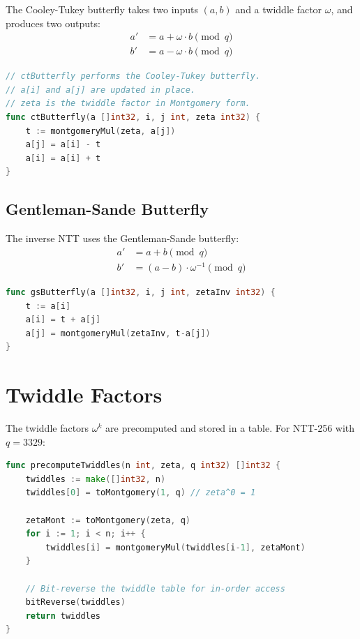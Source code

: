\documentclass[11pt,a4paper]{article}
\begin{document}
The Cooley-Tukey butterfly takes two inputs $(a, b)$ and a twiddle factor $\omega$, and
produces two outputs:
\begin{align}
a' &= a + \omega \cdot b \pmod{q} \\
b' &= a - \omega \cdot b \pmod{q}
\end{align}

\begin{lstlisting}[language=Go,caption={Cooley-Tukey butterfly in Go}]
// ctButterfly performs the Cooley-Tukey butterfly.
// a[i] and a[j] are updated in place.
// zeta is the twiddle factor in Montgomery form.
func ctButterfly(a []int32, i, j int, zeta int32) {
    t := montgomeryMul(zeta, a[j])
    a[j] = a[i] - t
    a[i] = a[i] + t
}
\end{lstlisting}

\subsection{Gentleman-Sande Butterfly}

The inverse NTT uses the Gentleman-Sande butterfly:
\begin{align}
a' &= a + b \pmod{q} \\
b' &= (a - b) \cdot \omega^{-1} \pmod{q}
\end{align}

\begin{lstlisting}[language=Go,caption={Gentleman-Sande butterfly for INTT}]
func gsButterfly(a []int32, i, j int, zetaInv int32) {
    t := a[i]
    a[i] = t + a[j]
    a[j] = montgomeryMul(zetaInv, t-a[j])
}
\end{lstlisting}

\section{Twiddle Factors}

The twiddle factors $\omega^k$ are precomputed and stored in a table. For NTT-256 with
$q = 3329$:

\begin{lstlisting}[language=Go,caption={Twiddle factor precomputation}]
func precomputeTwiddles(n int, zeta, q int32) []int32 {
    twiddles := make([]int32, n)
    twiddles[0] = toMontgomery(1, q) // zeta^0 = 1

    zetaMont := toMontgomery(zeta, q)
    for i := 1; i < n; i++ {
        twiddles[i] = montgomeryMul(twiddles[i-1], zetaMont)
    }

    // Bit-reverse the twiddle table for in-order access
    bitReverse(twiddles)
    return twiddles
}
\end{lstlisting}
\end{document}

